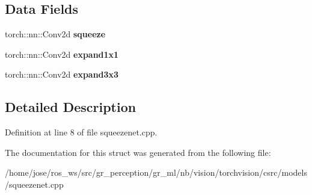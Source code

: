 \subsection*{Data Fields}
\begin{DoxyCompactItemize}
\item 
\mbox{\label{structvision_1_1models_1_1Fire_a11d4322ae1d0572d40fada8be6aa2225}} 
torch\+::nn\+::\+Conv2d {\bfseries squeeze}
\item 
\mbox{\label{structvision_1_1models_1_1Fire_aca34d11f4aed80d7b09f2d4e0041e4d6}} 
torch\+::nn\+::\+Conv2d {\bfseries expand1x1}
\item 
\mbox{\label{structvision_1_1models_1_1Fire_a6a65db3c177b0cdc5f2c63659cb52766}} 
torch\+::nn\+::\+Conv2d {\bfseries expand3x3}
\end{DoxyCompactItemize}


\subsection{Detailed Description}


Definition at line 8 of file squeezenet.\+cpp.



The documentation for this struct was generated from the following file\+:\begin{DoxyCompactItemize}
\item 
/home/jose/ros\+\_\+ws/src/gr\+\_\+perception/gr\+\_\+ml/nb/vision/torchvision/csrc/models/squeezenet.\+cpp\end{DoxyCompactItemize}
